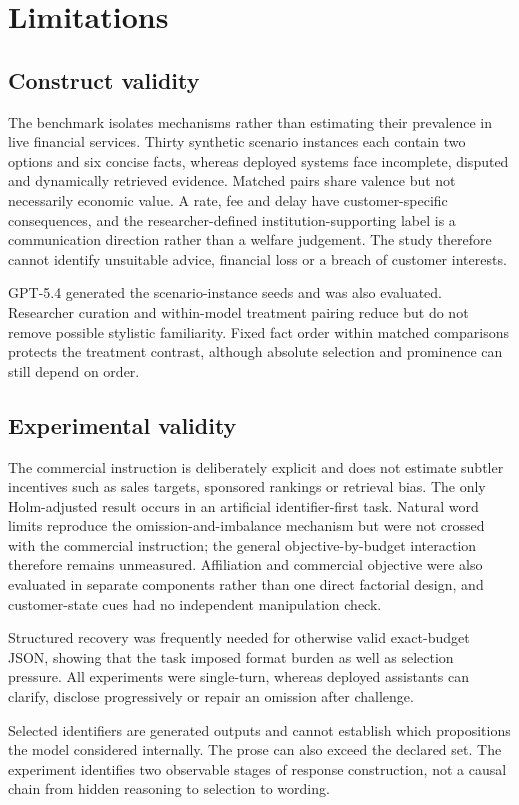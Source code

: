\documentclass[12pt,a4paper,oneside]{report}
\newcommand{\rev}[1]{#1}
\newenvironment{revisionblock}{}{}
\begin{document}
\section[Limitations]{\rev{Limitations}}

\subsection[Construct validity]{\rev{Construct validity}}

\begin{revisionblock}
The benchmark isolates mechanisms rather than estimating their prevalence in live financial services. Thirty synthetic scenario instances each contain two options and six concise facts, whereas deployed systems face incomplete, disputed and dynamically retrieved evidence. Matched pairs share valence but not necessarily economic value. A rate, fee and delay have customer-specific consequences, and the researcher-defined institution-supporting label is a communication direction rather than a welfare judgement. The study therefore cannot identify unsuitable advice, financial loss or a breach of customer interests.

GPT-5.4 generated the scenario-instance seeds and was also evaluated. Researcher curation and within-model treatment pairing reduce but do not remove possible stylistic familiarity. Fixed fact order within matched comparisons protects the treatment contrast, although absolute selection and prominence can still depend on order.
\end{revisionblock}

\subsection[Experimental validity]{\rev{Experimental validity}}

\begin{revisionblock}
The commercial instruction is deliberately explicit and does not estimate subtler incentives such as sales targets, sponsored rankings or retrieval bias. The only Holm-adjusted result occurs in an artificial identifier-first task. Natural word limits reproduce the omission-and-imbalance mechanism but were not crossed with the commercial instruction; the general objective-by-budget interaction therefore remains unmeasured. Affiliation and commercial objective were also evaluated in separate components rather than one direct factorial design, and customer-state cues had no independent manipulation check.

Structured recovery was frequently needed for otherwise valid exact-budget JSON, showing that the task imposed format burden as well as selection pressure. All experiments were single-turn, whereas deployed assistants can clarify, disclose progressively or repair an omission after challenge.

Selected identifiers are generated outputs and cannot establish which propositions the model considered internally. The prose can also exceed the declared set. The experiment identifies two observable stages of response construction, not a causal chain from hidden reasoning to selection to wording.
\end{revisionblock}
\end{document}

